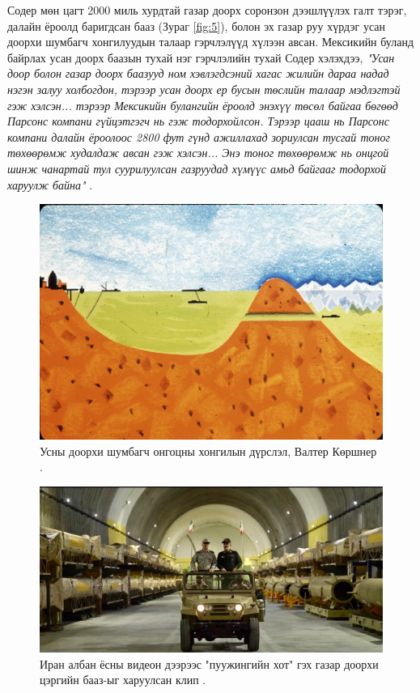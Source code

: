 \documentclass[10pt,twocolumn,letterpaper]{article}
\begin{document}
Содер мөн цагт 2000 миль хурдтай газар доорх соронзон дээшлүүлэх галт тэрэг, далайн ёроолд баригдсан бааз (Зураг \ref{fig:5}), болон эх газар руу хүрдэг усан доорхи шумбагч хонгилуудын талаар гэрчлэлүүд хүлээн авсан. Мексикийн буланд байрлах усан доорх баазын тухай нэг гэрчлэлийн тухай Содер хэлэхдээ, \textit{"Усан доор болон газар доорх баазууд ном хэвлэгдсэний хагас жилийн дараа надад нэгэн залуу холбогдон, тэрээр усан доорх ер бусын төслийн талаар мэдлэгтэй гэж хэлсэн... тэрээр Мексикийн булангийн ёроолд энэхүү төсөл байгаа бөгөөд Парсонс компани гүйцэтгэгч нь гэж тодорхойлсон. Тэрээр цааш нь Парсонс компани далайн ёроолоос 2800 фут гүнд ажиллахад зориулсан тусгай тоног төхөөрөмж худалдаж авсан гэж хэлсэн... Энэ тоног төхөөрөмж нь онцгой шинж чанартай тул суурилуулсан газруудад хүмүүс амьд байгааг тодорхой харуулж байна"} \cite{22}.
\begin{figure}[t]
\begin{center}
   \includegraphics[width=1\linewidth]{sub.jpg}
\end{center}
   \caption{Усны доорхи шумбагч онгоцны хонгилын дүрслэл, Валтер Көршнер \cite{22,23}.}
\label{fig:6}
\label{fig:onecol}
\end{figure}
\begin{figure}[t]
\begin{center}
   \includegraphics[width=1\linewidth]{iran.jpeg}
\end{center}
   \caption{Иран албан ёсны видеон дээрээс "пуужингийн хот" гэх газар доорхи цэргийн бааз-ыг харуулсан клип \cite{39,40}.}
\label{fig:12}
\label{fig:onecol}
\end{figure}
\end{document}
